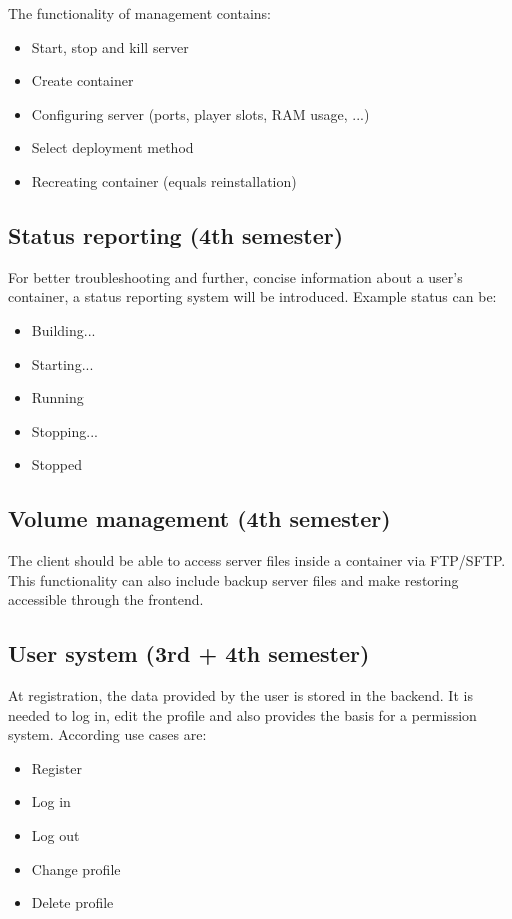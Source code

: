 \documentclass[a4paper,12pt,chapterprefix=false,bibliography=totoc,listof=totoc,]{scrreprt}
\begin{document}
 
The functionality of management contains:
\begin{itemize}
	\item Start, stop and kill server
	\item Create container
	\item Configuring server (ports, player slots, RAM usage, ...)
	\item Select deployment method
	\item Recreating container (equals reinstallation)
\end{itemize}

\subsection{Status reporting (4th semester)}
For better troubleshooting and further, concise information about a user's container, a status reporting system will be introduced. Example status can be:
\begin{itemize}
	\item Building...
	\item Starting...
	\item Running
	\item Stopping...
	\item Stopped
\end{itemize}

\subsection{Volume management (4th semester)}
The client should be able to access server files inside a container via FTP/SFTP. This functionality can also include backup server files and make restoring accessible through the frontend.

\subsection{User system (3rd + 4th semester)}
At registration, the data provided by the user is stored in the backend. It is needed to log in, edit the profile and also provides the basis for a permission system. According use cases are:

\begin{itemize}
	\item Register
	\item Log in
	\item Log out
	\item Change profile
	\item Delete profile
\end{itemize}
\end{document}
